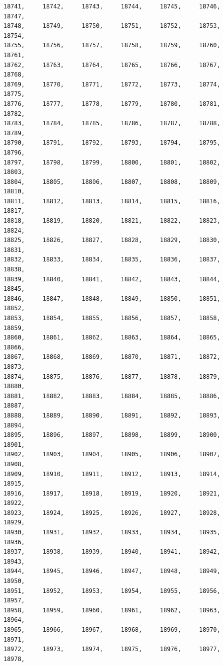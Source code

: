 \documentclass[a4paper,11pt]{report}
\begin{document}
\begin{verbatim}
18741,     18742,     18743,     18744,     18745,     18746,     18747,     
18748,     18749,     18750,     18751,     18752,     18753,     18754,     
18755,     18756,     18757,     18758,     18759,     18760,     18761,     
18762,     18763,     18764,     18765,     18766,     18767,     18768,     
18769,     18770,     18771,     18772,     18773,     18774,     18775,     
18776,     18777,     18778,     18779,     18780,     18781,     18782,     
18783,     18784,     18785,     18786,     18787,     18788,     18789,     
18790,     18791,     18792,     18793,     18794,     18795,     18796,     
18797,     18798,     18799,     18800,     18801,     18802,     18803,     
18804,     18805,     18806,     18807,     18808,     18809,     18810,     
18811,     18812,     18813,     18814,     18815,     18816,     18817,     
18818,     18819,     18820,     18821,     18822,     18823,     18824,     
18825,     18826,     18827,     18828,     18829,     18830,     18831,     
18832,     18833,     18834,     18835,     18836,     18837,     18838,     
18839,     18840,     18841,     18842,     18843,     18844,     18845,     
18846,     18847,     18848,     18849,     18850,     18851,     18852,     
18853,     18854,     18855,     18856,     18857,     18858,     18859,     
18860,     18861,     18862,     18863,     18864,     18865,     18866,     
18867,     18868,     18869,     18870,     18871,     18872,     18873,     
18874,     18875,     18876,     18877,     18878,     18879,     18880,     
18881,     18882,     18883,     18884,     18885,     18886,     18887,     
18888,     18889,     18890,     18891,     18892,     18893,     18894,     
18895,     18896,     18897,     18898,     18899,     18900,     18901,     
18902,     18903,     18904,     18905,     18906,     18907,     18908,     
18909,     18910,     18911,     18912,     18913,     18914,     18915,     
18916,     18917,     18918,     18919,     18920,     18921,     18922,     
18923,     18924,     18925,     18926,     18927,     18928,     18929,     
18930,     18931,     18932,     18933,     18934,     18935,     18936,     
18937,     18938,     18939,     18940,     18941,     18942,     18943,     
18944,     18945,     18946,     18947,     18948,     18949,     18950,     
18951,     18952,     18953,     18954,     18955,     18956,     18957,     
18958,     18959,     18960,     18961,     18962,     18963,     18964,     
18965,     18966,     18967,     18968,     18969,     18970,     18971,     
18972,     18973,     18974,     18975,     18976,     18977,     18978,     

\end{verbatim}
\end{document}

